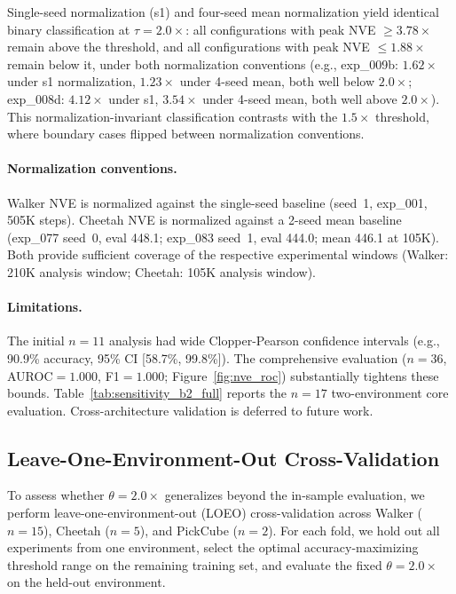 Single-seed normalization (s1) and four-seed mean normalization yield identical binary classification at $\tau{=}2.0\times$: all configurations with peak NVE $\geq 3.78\times$ remain above the threshold, and all configurations with peak NVE $\leq 1.88\times$ remain below it, under both normalization conventions (e.g., exp\_009b: $1.62\times$ under s1 normalization, $1.23\times$ under 4-seed mean, both well below $2.0\times$; exp\_008d: $4.12\times$ under s1, $3.54\times$ under 4-seed mean, both well above $2.0\times$). This normalization-invariant classification contrasts with the $1.5\times$ threshold, where boundary cases flipped between normalization conventions.

\paragraph{Normalization conventions.} Walker NVE is normalized against the single-seed baseline (seed~1, exp\_001, 505K steps). Cheetah NVE is normalized against a 2-seed mean baseline (exp\_077 seed~0, eval 448.1; exp\_083 seed~1, eval 444.0; mean 446.1 at 105K). Both provide sufficient coverage of the respective experimental windows (Walker: 210K analysis window; Cheetah: 105K analysis window).

\paragraph{Limitations.} The initial $n{=}11$ analysis had wide Clopper-Pearson confidence intervals (e.g., 90.9\% accuracy, 95\% CI [58.7\%, 99.8\%]). The comprehensive evaluation ($n{=}36$, AUROC${=}1.000$, F1${=}1.000$; Figure~\ref{fig:nve_roc}) substantially tightens these bounds. Table~\ref{tab:sensitivity_b2_full} reports the $n{=}17$ two-environment core evaluation. Cross-architecture validation is deferred to future work.

\subsection{Leave-One-Environment-Out Cross-Validation}
\label{sec:nve_loeo}

To assess whether $\theta{=}2.0\times$ generalizes beyond the in-sample evaluation, we perform leave-one-environment-out (LOEO) cross-validation across Walker ($n{=}15$), Cheetah ($n{=}5$), and PickCube ($n{=}2$). For each fold, we hold out all experiments from one environment, select the optimal accuracy-maximizing threshold range on the remaining training set, and evaluate the fixed $\theta{=}2.0\times$ on the held-out environment.

